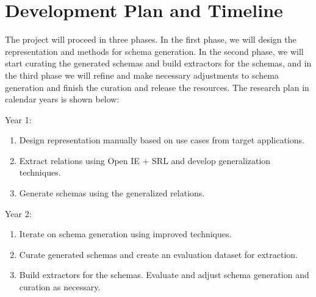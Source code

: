 \section{Development Plan and Timeline}

The project will proceed in three phases. In the first phase, we will design the representation and methods for schema generation. In the second phase, we will start curating the generated schemas and build extractors for the schemas, and in the third phase we will refine and make necessary adjustments to schema generation and finish the curation and release the resources. The research plan in calendar years is shown below:


Year 1:  
\begin{enumerate}
\item Design representation manually based on use cases from target applications.
\item Extract relations using Open IE + SRL and develop generalization techniques.
\item Generate schemas using the generalized relations. 
\end{enumerate}
Year 2:
\begin{enumerate}
\item Iterate on schema generation using improved techniques. 
\item Curate generated schemas and create an evaluation dataset for extraction.
\item Build extractors for the schemas. Evaluate and adjust schema generation and curation as necessary. 
\end{enumerate}


